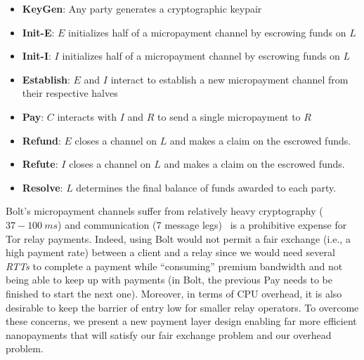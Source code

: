 \begin{itemize}
\item \textbf{KeyGen}: Any party generates a cryptographic keypair
\item \textbf{Init-E}: $E$ initializes half of a micropayment channel by
  escrowing funds on $L$
\item \textbf{Init-I}: $I$ initializes half of a micropayment channel by
  escrowing funds on $L$
\item \textbf{Establish}: $E$ and $I$ interact to establish a new micropayment
  channel from their respective halves
\item \textbf{Pay}: $C$ interacts with $I$ and $R$ to send a single micropayment
  to $R$
\item \textbf{Refund}: $E$ closes a channel on $L$ and makes a claim on the
  escrowed funds.
\item \textbf{Refute}: $I$ closes a channel on $L$ and makes a claim on the
  escrowed funds.
\item \textbf{Resolve}: $L$ determines the final balance of funds awarded to
  each party.
\end{itemize}

Bolt's micropayment channels suffer from relatively heavy cryptography
($37-100\ ms$) and communication (7 message legs)~\cite{green2017bolt} is a
prohibitive expense for Tor relay payments. Indeed, using Bolt would not permit
a fair exchange (i.e., a high payment rate) between a client and a relay since
we would need several \textit{RTTs} to complete a payment while ``consuming''
premium bandwidth and not being able to keep up with payments (in Bolt, the
previous Pay needs to be finished to start the next one). Moreover, in terms of
CPU overhead, it is also desirable to keep the barrier of entry low for smaller
relay operators. To overcome these concerns, we present a new payment layer
design enabling far more efficient nanopayments that will satisfy our fair
exchange problem and our overhead problem.

